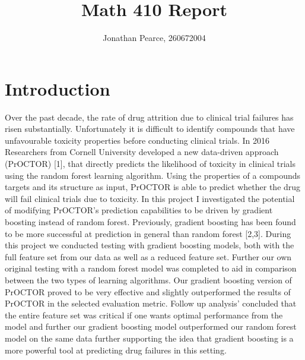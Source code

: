 \documentclass[12pt]{article}
\begin{document}
 
 
\title{Math 410 Report}
\author{Jonathan Pearce, 260672004}
\maketitle

\section{Introduction}
Over the past decade, the rate of drug attrition due to clinical trial failures has risen substantially. Unfortunately it is difficult to identify compounds that have unfavourable toxicity properties before conducting clinical trials. In 2016 Researchers from Cornell University developed a new data-driven approach (PrOCTOR) [1], that directly predicts the likelihood of toxicity in clinical trials using the random forest learning algorithm. Using the properties of a compounds targets and its structure as input, PrOCTOR is able to predict whether the drug will fail clinical trials due to toxicity. In this project I investigated the potential of modifying PrOCTOR's prediction capabilities to be driven by gradient boosting instead of random forest. Previously, gradient boosting has been found to be more successful at prediction in general than random forest [2,3]. During this project we conducted testing with gradient boosting models, both with the full feature set from our data as well as a reduced feature set. Further our own original testing with a random forest model was completed to aid in comparison between the two types of learning algorithms. Our gradient boosting version of PrOCTOR proved to be very effective and slightly outperformed the results of PrOCTOR in the selected evaluation metric. Follow up analysis' concluded that the entire feature set was critical if one wants optimal performance from the model and further our gradient boosting model outperformed our random forest model on the same data further supporting the idea that gradient boosting is a more powerful tool at predicting drug failures in this setting.
\end{document}
